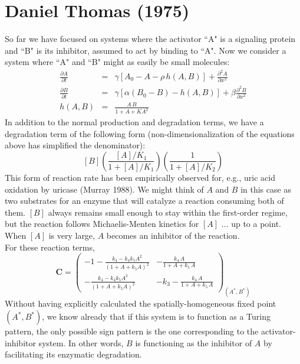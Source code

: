 \documentclass{article}
\begin{document}
\section*{Daniel Thomas (1975)}
So far we have focused on systems where the activator ``A" is a signaling protein and ``B" is its inhibitor, assumed to act by binding to ``A". Now we consider a system where ``A" and ``B" might as easily be small molecules:
\begin{eqnarray*}
\frac{\partial A}{\partial t} & = & \gamma \left[ A_0 - A - \rho \, h(A,B) \right] + \frac{\partial^2 A}{\partial x^2}\\
\frac{\partial B}{\partial t} & = & \gamma \left[ \alpha \left(  B_0 - B \right) - h(A,B) \right] + \beta \frac{\partial^2 B}{\partial x^2} \\
h(A,B) & = & \frac{ A \, B}{1 + A + K A^2} 
\end{eqnarray*}
In addition to the normal production and degradation terms, we have a degradation term of the following form (non-dimensionalization of the equations above has simplified the denominator):
\[ \left[ B \right] \left( \frac{\left[ A \right]/K_1}{1 + \left[ A \right]/K_1} \right)\left( \frac{1}{1 + \left[ A \right]/K_2} \right) \]
This form of reaction rate has been empirically observed for, e.g., uric acid oxidation by uricase (Murray 1988). We might think of $A$ and $B$ in this case as two substrates for an enzyme that will catalyze a reaction consuming both of them. $[B]$ always remains small enough to stay within the first-order regime, but the reaction follows Michaelis-Menten kinetics for $[A]$ $\ldots$ up to a point. When $[A]$ is very large, $A$ becomes an inhibitor of the reaction.\\

For these reaction terms,
\[ \mathbf{C} = \begin{pmatrix} -1 - \frac{k_4 - k_4 k_5 A^2}{(1 + A + k_5 A)^2} &  - \frac{k_4 \, A}{1 + A + k_5 \, A} \\  - \frac{k_4 - k_4 k_5 A^2}{(1 + A + k_5 A)^2} & - k_3 - \frac{k_4 \, A}{1 + A + k_5 \, A} \end{pmatrix}_{(A^*,B^*)} \]
Without having explicitly calculated the spatially-homogeneous fixed point $(A^*,B^*)$, we know already that if this system is to function as a Turing pattern, the only possible sign pattern is the one corresponding to the activator-inhibitor system. In other words, $B$ is functioning as the inhibitor of $A$ by facilitating its enzymatic degradation.\\
\end{document}

